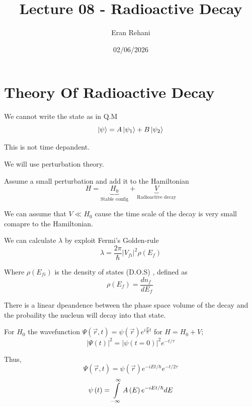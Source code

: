 \documentclass[11pt,a4paper]{article}
\author{Eran Rehani}
\title{Lecture 08 - Radioactive Decay}
\date{02/06/2026}
\begin{document}
\maketitle

\section{Theory Of Radioactive Decay}

We cannot write the state as in Q.M
\begin{equation}
    \ket{\psi}=A\ket{\psi_{1}}+B\ket{\psi_{2}}
\end{equation}

This is not time depandent.

We will use perturbation theory.

Assume a small perturbation and add it to the Hamiltonian
\begin{equation}
    H=\underset{\text{Stable config}}{\underbrace{H_{0}}}+\underset{\text{Radioactive decay}}{\underbrace{V}}
\end{equation}

We can assume that $V\ll H_{0}$ cause the time scale of the decay
is very small comapre to the Hamiltonian.

We can calculate $\lambda$ by exploit Fermi's Golden-rule
\begin{equation}
    \lambda=\frac{2\pi}{\hbar}\left|V_{fi}\right|^{2}\rho\left(E_{f}\right)
\end{equation}

Where $\rho\left(E_{fi}\right)$ is the density of states (D.O.S)
, defined as
\begin{equation}
    \rho\left(E_{f}\right)=\frac{dn_{f}~}{dE_{f}}~
\end{equation}

There is a linear dpeandence between the phase space volume of the
decay and the probaility the nucleun will decay into that state.

For $H_{0}$ the wavefunction $\Psi\left(\vec{r},t\right)=\psi\left(\vec{r}\right)e^{i\frac{E}{\hbar}t}$
for $H=H_{0}+V;$
\begin{equation}
    \left|\Psi\left(t\right)\right|^{2}=\left|\psi\left(t=0\right)\right|^{2}e^{-t/\tau}
\end{equation}

Thus,
\begin{equation}
    \Psi\left(\vec{r},t\right)=\psi\left(\vec{r}\right)e^{-iEt/\hbar}e^{-t/2\tau}
\end{equation}
\begin{equation}
    \psi\left(t\right)=\intop^{\infty}_{-\infty}A\left(E\right)e^{-iEt/\hbar}dE
\end{equation}
\end{document}
